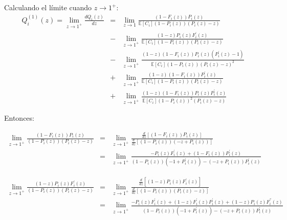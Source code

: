 \documentclass{article}
\newcommand{\esp}{\mathbb{E}}
\begin{document}
Calculando el l\'imite cuando $z\rightarrow1^{+}$:
\begin{eqnarray}
Q_{i}^{(1)}\left(z\right)=\lim_{z\rightarrow1^{+}}\frac{d Q_{i}\left(z\right)}{dz}&=&\lim_{z\rightarrow1}\frac{\left(1-F_{i}\left(z\right)\right)P_{i}\left(z\right)}{\esp\left[C_{i}\right]\left(1-P_{i}\left(z\right)\right)\left(P_{i}\left(z\right)-z\right)}\\
&-&\lim_{z\rightarrow1^{+}}\frac{\left(1-z\right)P_{i}\left(z\right)F_{i}^{'}\left(z\right)}{\esp\left[C_{i}\right]\left(1-P_{i}\left(z\right)\right)\left(P_{i}\left(z\right)-z\right)}\\
&-&\lim_{z\rightarrow1^{+}}\frac{\left(1-z\right)\left(1-F_{i}\left(z\right)\right)P_{i}\left(z\right)\left(P_{i}^{'}\left(z\right)-1\right)}{\esp\left[C_{i}\right]\left(1-P_{i}\left(z\right)\right)\left(P_{i}\left(z\right)-z\right)^{2}}\\
&+&\lim_{z\rightarrow1^{+}}\frac{\left(1-z\right)\left(1-F_{i}\left(z\right)\right)P_{i}^{'}\left(z\right)}{\esp\left[C_{i}\right]\left(1-P_{i}\left(z\right)\right)\left(P_{i}\left(z\right)-z\right)}\\
&+&\lim_{z\rightarrow1^{+}}\frac{\left(1-z\right)\left(1-F_{i}\left(z\right)\right)P_{i}\left(z\right)P_{i}^{'}\left(z\right)}{\esp\left[C_{i}\right]\left(1-P_{i}\left(z\right)\right)^{2}\left(P_{i}\left(z\right)-z\right)}
\end{eqnarray}

Entonces:

\begin{eqnarray*}
\lim_{z\rightarrow1^{+}}\frac{\left(1-F_{i}\left(z\right)\right)P_{i}\left(z\right)}{\left(1-P_{i}\left(z\right)\right)\left(P_{i}\left(z\right)-z\right)}&=&\lim_{z\rightarrow1^{+}}\frac{\frac{d}{dz}\left[\left(1-F_{i}\left(z\right)\right)P_{i}\left(z\right)\right]}{\frac{d}{dz}\left[\left(1-P_{i}\left(z\right)\right)\left(-z+P_{i}\left(z\right)\right)\right]}\\
&=&\lim_{z\rightarrow1^{+}}\frac{-P_{i}\left(z\right)F_{i}^{'}\left(z\right)+\left(1-F_{i}\left(z\right)\right)P_{i}^{'}\left(z\right)}{\left(1-P_{i}\left(z\right)\right)\left(-1+P_{i}^{'}\left(z\right)\right)-\left(-z+P_{i}\left(z\right)\right)P_{i}^{'}\left(z\right)}
\end{eqnarray*}




\begin{eqnarray*}
\lim_{z\rightarrow1^{+}}\frac{\left(1-z\right)P_{i}\left(z\right)F_{i}^{'}\left(z\right)}{\left(1-P_{i}\left(z\right)\right)\left(P_{i}\left(z\right)-z\right)}&=&\lim_{z\rightarrow1^{+}}\frac{\frac{d}{dz}\left[\left(1-z\right)P_{i}\left(z\right)F_{i}^{'}\left(z\right)\right]}{\frac{d}{dz}\left[\left(1-P_{i}\left(z\right)\right)\left(P_{i}\left(z\right)-z\right)\right]}\\
&=&\lim_{z\rightarrow1^{+}}\frac{-P_{i}\left(z\right) F_{i}^{'}\left(z\right)+(1-z) F_{i}^{'}\left(z\right) P_{i}^{'}\left(z\right)+(1-z) P_{i}\left(z\right)F_{i}^{''}\left(z\right)}{\left(1-P_{i}\left(z\right)\right)\left(-1+P_{i}^{'}\left(z\right)\right)-\left(-z+P_{i}\left(z\right)\right)P_{i}^{'}\left(z\right)}
\end{eqnarray*}
\end{document}
